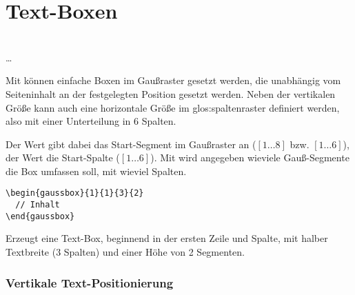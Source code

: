 \clearpage
\section{Text-Boxen}\label{sec:gausslayout:gaussbox}

\begin{Declaration}
          \\
  \quad\dots\\
\end{Declaration}

Mit  können einfache Boxen im Gaußraster gesetzt werden,
die unabhängig vom Seiteninhalt an der festgelegten Position gesetzt werden.
Neben der vertikalen Größe kann auch eine horizontale Größe im
\gls{glos:spaltenraster}
definiert werden, also mit einer Unterteilung in 6 Spalten.

Der Wert  gibt dabei das Start-Segment im Gaußraster an
($[1\ldots 8]$ bzw. $[1\ldots6]$),
der Wert  die Start-Spalte ($[1\ldots6]$).
Mit  wird angegeben wieviele Gauß-Segmente die Box umfassen soll,
mit  wieviel Spalten.

\begin{example}\hfill
  \begin{lstlisting}
\begin{gaussbox}{1}{1}{3}{2}
  // Inhalt
\end{gaussbox}
  \end{lstlisting}
  Erzeugt eine Text-Box, beginnend in der ersten Zeile und Spalte,
  mit halber Textbreite (3 Spalten) und einer Höhe von 2 Segmenten.
\end{example}


\subsubsection{Vertikale Text-Positionierung}

\begin{Declaration}
  \\
  \\
\end{Declaration}

